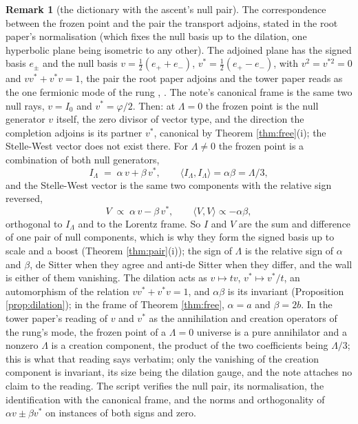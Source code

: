 \documentclass[11pt]{article}
\theoremstyle{definition}
\newtheorem{remark}[theorem]{Remark}
\newcommand{\ip}[2]{\langle #1, #2\rangle}
\begin{document}
\begin{remark}[the dictionary with the ascent's null pair]\label{rem:nullpair}
The correspondence between the frozen point and the pair the transport adjoins, stated in the root paper's normalisation (which fixes the null basis up to the dilation, one hyperbolic plane being isometric to any other). The adjoined plane has the signed basis $e_{\pm}$ and the null basis $v = \tfrac12(e_{+} + e_{-})$, $v^{*} = \tfrac12(e_{+} - e_{-})$, with $v^{2} = v^{*2} = 0$ and $vv^{*} + v^{*}v = 1$, the pair the root paper adjoins and the tower paper reads as the one fermionic mode of the rung \cite[\S 2.2]{ButlerT1}, \cite[Prop.~4.1, Thm.~4.2]{ButlerT3}. The note's canonical frame is the same two null rays, $v = I_{0}$ and $v^{*} = \varphi/2$. Then: at $\Lambda = 0$ the frozen point is the null generator $v$ itself, the zero divisor of vector type, and the direction the completion adjoins is its partner $v^{*}$, canonical by Theorem \ref{thm:free}(i); the Stelle-West vector does not exist there. For $\Lambda \neq 0$ the frozen point is a combination of both null generators,
\[
I_{\Lambda} \;=\; \alpha\, v + \beta\, v^{*}, \qquad \ip{I_{\Lambda}}{I_{\Lambda}} = \alpha\beta = \Lambda/3 ,
\]
and the Stelle-West vector is the same two components with the relative sign reversed,
\[
V \;\propto\; \alpha\, v - \beta\, v^{*}, \qquad \ip{V}{V} \propto -\alpha\beta ,
\]
orthogonal to $I_{\Lambda}$ and to the Lorentz frame. So $I$ and $V$ are the sum and difference of one pair of null components, which is why they form the signed basis up to scale and a boost (Theorem \ref{thm:pair}(i)); the sign of $\Lambda$ is the relative sign of $\alpha$ and $\beta$, de Sitter when they agree and anti-de Sitter when they differ, and the wall is either of them vanishing. The dilation acts as $v \mapsto tv$, $v^{*} \mapsto v^{*}/t$, an automorphism of the relation $vv^{*} + v^{*}v = 1$, and $\alpha\beta$ is its invariant (Proposition \ref{prop:dilation}); in the frame of Theorem \ref{thm:free}, $\alpha = a$ and $\beta = 2b$. In the tower paper's reading of $v$ and $v^{*}$ as the annihilation and creation operators of the rung's mode, the frozen point of a $\Lambda = 0$ universe is a pure annihilator and a nonzero $\Lambda$ is a creation component, the product of the two coefficients being $\Lambda/3$; this is what that reading says verbatim; only the vanishing of the creation component is invariant, its size being the dilation gauge, and the note attaches no claim to the reading. The script verifies the null pair, its normalisation, the identification with the canonical frame, and the norms and orthogonality of $\alpha v \pm \beta v^{*}$ on instances of both signs and zero.
\end{remark}
\end{document}
